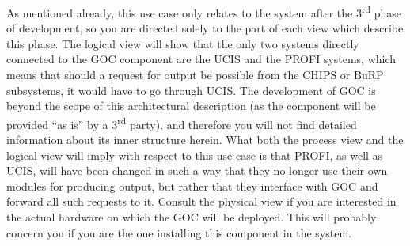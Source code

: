 As mentioned already, this use case only relates to the system after the 3\textsuperscript{rd} phase of development,
so you are directed solely to the part of each view which describe this phase. The logical view will show that the
only two systems directly connected to the GOC component are the UCIS and the PROFI systems, which means
that should a request for output be possible from the CHIPS or BuRP subsystems, it would have to go through UCIS.
The development of GOC is beyond the scope of this architectural description (as the component will be provided
``as is'' by a 3\textsuperscript{rd} party), and therefore you will not find detailed information about its inner structure
herein. What both the process view and the logical view will imply with respect to this use case is that PROFI, as well
as UCIS, will have been changed in such a way that they no longer use their own modules for producing output, but
rather that they interface with GOC and forward all such requests to it. Consult the physical
view if you are interested in the actual hardware on which the GOC will be deployed. This will probably concern you
if you are the one installing this component in the system.